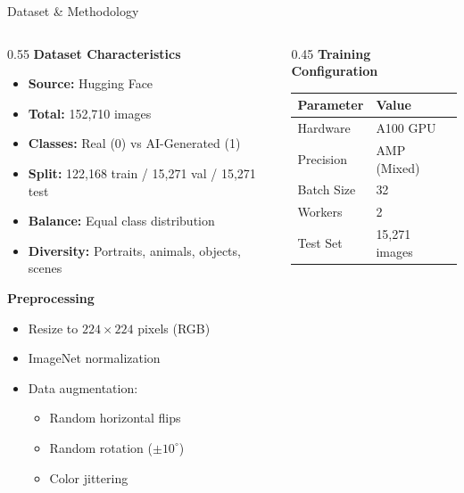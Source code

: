 \documentclass[aspectratio=169]{beamer}
\begin{document}
\begin{frame}{Dataset \& Methodology}
    \begin{columns}[T]
        \begin{column}{0.55\textwidth}
            \textbf{Dataset Characteristics}
            \begin{itemize}
                \item \textbf{Source:} Hugging Face
                \item \textbf{Total:} 152,710 images
                \item \textbf{Classes:} Real (0) vs AI-Generated (1)
                \item \textbf{Split:} 122,168 train / 15,271 val / 15,271 test
                \item \textbf{Balance:} Equal class distribution
                \item \textbf{Diversity:} Portraits, animals, objects, scenes
            \end{itemize}
            
            \vspace{0.3cm}
            \textbf{Preprocessing}
            \begin{itemize}
                \item Resize to $224 \times 224$ pixels (RGB)
                \item ImageNet normalization
                \item Data augmentation:
                    \begin{itemize}
                        \scriptsize
                        \item Random horizontal flips
                        \item Random rotation ($\pm 10^\circ$)
                        \item Color jittering
                    \end{itemize}
            \end{itemize}
        \end{column}
        
        \begin{column}{0.45\textwidth}
            \textbf{Training Configuration}
            \begin{table}[h]
                \scriptsize
                \begin{tabular}{ll}
                    \toprule
                    \textbf{Parameter} & \textbf{Value} \\
                    \midrule
                    Hardware & A100 GPU \\
                    Precision & AMP (Mixed) \\
                    Batch Size & 32 \\
                    Workers & 2 \\
                    Test Set & 15,271 images \\
                    \bottomrule
                \end{tabular}
            \end{table}
            

\end{column}
\end{columns}
\end{frame}
\end{document}
